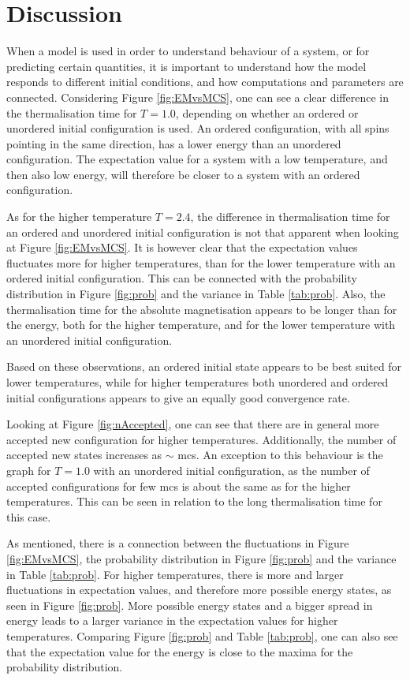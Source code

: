 \section{Discussion}
\label{sec:discussion}
When a model is used in order to understand behaviour of a system, or for predicting certain quantities, it is important to understand how the model responds to different initial conditions, and how computations and parameters are connected. 
Considering Figure \ref{fig:EMvsMCS}, one can see a clear difference in the thermalisation time for $T=1.0$, depending on whether an ordered or unordered initial configuration is used. An ordered configuration, with all spins pointing in the same direction, has a lower energy than an unordered configuration. The expectation value for a system with a low temperature, and then also low energy, will therefore be closer to a system with an ordered configuration. 

As for the higher temperature $T=2.4$, the difference in thermalisation time for an ordered and unordered initial configuration is not that apparent when looking at Figure \ref{fig:EMvsMCS}. It is however clear that the expectation values fluctuates more for higher temperatures, than for the lower temperature with an ordered initial configuration. This can be connected with the probability distribution in Figure \ref{fig:prob} and the variance in Table \ref{tab:prob}. Also, the thermalisation time for the absolute magnetisation appears to be longer than for the energy, both for the higher temperature, and for the lower temperature with an unordered initial configuration. 

Based on these observations, an ordered initial state appears to be best suited for lower temperatures, while for higher temperatures both unordered and ordered initial configurations appears to give an equally good convergence rate.  

Looking at Figure \ref{fig:nAccepted}, one can see that there are in general more accepted new configuration for higher temperatures. Additionally, the number of accepted new states increases as $\sim$ mcs. An exception to this behaviour is the graph for $T=1.0$ with an unordered initial configuration, as the number of accepted configurations for few mcs is about the same as for the higher temperatures. This can be seen in relation to the long thermalisation time for this case. 

As mentioned, there is a connection between the fluctuations in Figure \ref{fig:EMvsMCS}, the probability distribution in Figure \ref{fig:prob} and the variance in Table \ref{tab:prob}. For higher temperatures, there is more and larger fluctuations in expectation values, and therefore more possible energy states, as seen in Figure \ref{fig:prob}. More possible energy states and a bigger spread in energy leads to a larger variance in the expectation values for higher temperatures. Comparing Figure \ref{fig:prob} and Table \ref{tab:prob}, one can also see that the expectation value for the energy is close to the maxima for the probability distribution. 


